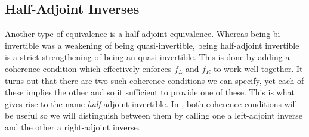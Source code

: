 \documentclass[draft]{article}
\theoremstyle{definition} \newtheorem{definition}{Definition}
\theoremstyle{remark} \newtheorem{remark}{Remark}
\begin{document}
\subsection{Half-Adjoint Inverses}\label{sec:hai}

Another type of equivalence is a half-adjoint equivalence. Whereas
being bi-invertible was a weakening of being quasi-invertible, being
half-adjoint invertible is a strict strengthening of being an
quasi-invertible. This is done by adding a coherence condition which
effectively enforces \(f_L\) and \(f_R\) to work well together. It
turns out that there are two such coherence conditions we can specify,
yet each of these implies the other and so it sufficient to provide
one of these. This
is what gives rise to the name \emph{half}-adjoint invertible. In
, both coherence conditions will be useful
so we will distinguish between them by calling one a left-adjoint
inverse and the other a right-adjoint inverse.
\end{document}
